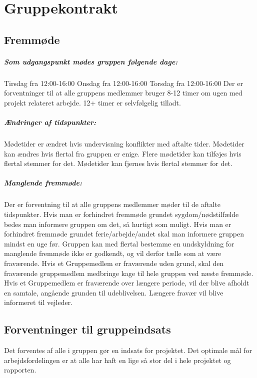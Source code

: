 \chapter{Gruppekontrakt}
\section{Fremmøde}
\paragraph{Som udgangspunkt mødes gruppen følgende dage:}
Tirsdag fra 12:00-16:00
Onsdag fra 12:00-16:00
Torsdag fra 12:00-16:00
Der er forventninger til at alle gruppens medlemmer bruger 8-12 timer om ugen med projekt relateret arbejde.
12+ timer er selvfølgelig tilladt.

\paragraph{Ændringer af tidspunkter:}
Mødetider er ændret hvis undervisning konflikter med aftalte tider.
Mødetider kan ændres hvis flertal fra gruppen er enige.
Flere mødetider kan tilføjes hvis flertal stemmer for det.
Mødetider kan fjernes hvis flertal stemmer for det.

\paragraph{Manglende fremmøde:}
Der er forventning til at alle gruppens medlemmer møder til de aftalte                 tidspunkter.
Hvis man er forhindret fremmøde grundet sygdom/nødstilfælde bedes man informere gruppen om det, så hurtigt som muligt.
Hvis man er forhindret fremmøde grundet ferie/arbejde/andet skal man informere gruppen mindst en uge før.
Gruppen kan med flertal bestemme en undskyldning for manglende fremmøde ikke er godkendt, og vil derfor tælle som at være fraværende.
Hvis et Gruppemedlem er fraværende uden grund, skal den fraværende gruppemedlem medbringe kage til hele gruppen ved næste fremmøde.
Hvis et Gruppemedlem er fraværende over længere periode, vil der blive afholdt en samtale, angående grunden til udeblivelsen.
Længere fravær vil blive informeret til vejleder.




\section{Forventninger til gruppeindsats}
Det forventes af alle i gruppen gør en indsats for projektet.
Det optimale mål for arbejdsfordelingen er at alle har haft en lige så stor del i hele projektet og rapporten.


